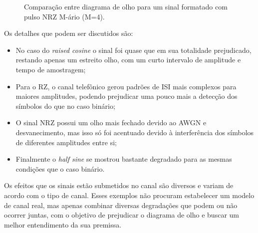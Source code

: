 \begin{figure}[H]
\begin{center}
\end{center}
\caption{Comparação entre diagrama de olho para um sinal formatado com pulso NRZ M-ário (M=4).}
\label{fig:8} 
\end{figure}

Os detalhes que podem ser discutidos são:

\begin{itemize}
    \item No caso do \textit{raised cosine} o sinal foi quase que em sua totalidade prejudicado, restando apenas um estreito olho, com um curto intervalo de amplitude e tempo de amostragem;
    \item Para o RZ, o canal telefônico gerou padrões de ISI mais complexos para maiores amplitudes, podendo prejudicar uma pouco mais a detecção dos símbolos do que no caso binário;
    \item O sinal NRZ possui um olho mais fechado devido ao AWGN e desvanecimento, mas isso só foi acentuado devido à interferência dos símbolos de diferentes amplitudes entre si;
    \item Finalmente o \textit{half sine} se mostrou bastante degradado para as mesmas condições que o caso binário.
\end{itemize}

Os efeitos que os sinais estão submetidos no canal são diversos e variam de acordo com o tipo de canal. Esses exemplos não procuram estabelecer um modelo de canal real, mas apenas combinar diversas degradações que podem ou não ocorrer juntas, com o objetivo de prejudicar o diagrama de olho e buscar um melhor entendimento da sua premissa.